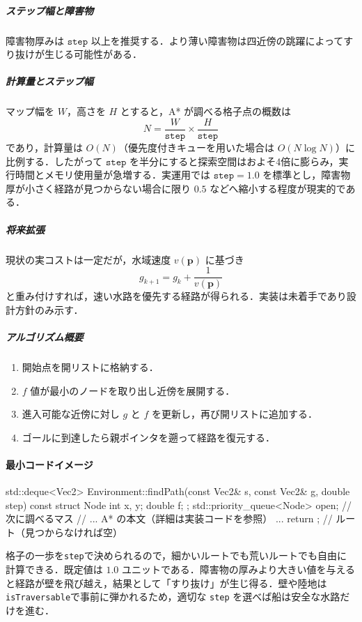 \documentclass[10pt,letterpaper]{jsarticle}
\begin{document}
\subparagraph{ステップ幅と障害物}
障害物厚みは $\texttt{step}$ 以上を推奨する．より薄い障害物は四近傍の跳躍によってすり抜けが生じる可能性がある．

\subparagraph{計算量とステップ幅}
マップ幅を $W$，高さを $H$ とすると，A* が調べる格子点の概数は
\begin{equation}
  N = \frac{W}{\texttt{step}} \times \frac{H}{\texttt{step}}
\end{equation}
であり，計算量は $O(N)$（優先度付きキューを用いた場合は $O(N \log N)$）に比例する．したがって $\texttt{step}$ を半分にすると探索空間はおよそ4倍に膨らみ，実行時間とメモリ使用量が急増する．実運用では $\texttt{step}=1.0$ を標準とし，障害物厚が小さく経路が見つからない場合に限り $0.5$ などへ縮小する程度が現実的である．

\subparagraph{将来拡張}
現状の実コストは一定だが，水域速度 $v(\bm{p})$ に基づき
\begin{equation}
  g_{k+1} = g_k + \frac{1}{v(\bm{p})}
\end{equation}
と重み付けすれば，速い水路を優先する経路が得られる．実装は未着手であり設計方針のみ示す．

\subparagraph{アルゴリズム概要}
\begin{enumerate}
  \item 開始点を開リストに格納する．
  \item $f$ 値が最小のノードを取り出し近傍を展開する．
  \item 進入可能な近傍に対し $g$ と $f$ を更新し，再び開リストに追加する．
  \item ゴールに到達したら親ポインタを遡って経路を復元する．
\end{enumerate}

\paragraph{最小コードイメージ}
\begin{cppcode}
std::deque<Vec2> Environment::findPath(const Vec2& s, const Vec2& g, double step) const {
    struct Node { int x, y; double f; };
    std::priority_queue<Node> open; // 次に調べるマス
    // ... A* の本文（詳細は実装コードを参照） ...
    return {}; // ルート（見つからなければ空）
}
\end{cppcode}

格子の一歩を\texttt{step}で決められるので，細かいルートでも荒いルートでも自由に計算できる．既定値は $1.0$ ユニットである．障害物の厚みより大きい値を与えると経路が壁を飛び越え，結果として「すり抜け」が生じ得る．壁や陸地は\texttt{isTraversable}で事前に弾かれるため，適切な \texttt{step} を選べば船は安全な水路だけを進む．
\end{document}
